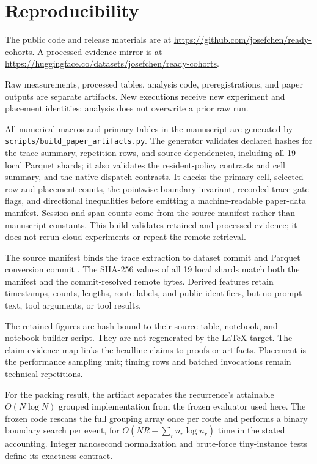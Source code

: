 \section{Reproducibility}
\label{sec:reproducibility}

The public code and release materials are at
\url{https://github.com/josefchen/ready-cohorts}. A processed-evidence mirror is
at \url{https://huggingface.co/datasets/josefchen/ready-cohorts}.

Raw measurements, processed tables, analysis code, preregistrations, and paper
outputs are separate artifacts. New executions receive new experiment and
placement identities; analysis does not overwrite a prior raw run.

All numerical macros and primary tables in the manuscript are generated by
\texttt{scripts/build\_paper\_artifacts.py}. The generator validates declared
hashes for the trace summary, repetition rows, and source dependencies,
including all 19 local Parquet shards; it also validates the resident-policy
contrasts and cell summary, and the native-dispatch contrasts. It checks the
primary cell, selected row and placement counts, the pointwise boundary
invariant, recorded trace-gate flags, and directional inequalities before
emitting a machine-readable paper-data manifest. Session and span counts come
from the source manifest rather than manuscript constants. This build validates
retained and processed evidence; it does not rerun cloud experiments or repeat
the remote retrieval.

The source manifest binds the trace extraction to dataset commit
 and Parquet conversion commit
. The SHA-256 values of all 19
local shards match both the manifest and the commit-resolved remote bytes.
Derived features retain timestamps, counts, lengths, route labels, and public
identifiers, but no prompt text, tool arguments, or tool results.

The retained figures are hash-bound to their source table, notebook, and
notebook-builder script. They are not regenerated by the LaTeX target. The
claim-evidence map links the headline claims to proofs or artifacts. Placement
is the performance sampling unit; timing rows and batched invocations remain
technical repetitions.

For the packing result, the artifact separates the recurrence's attainable
$O(N\log N)$ grouped implementation from the frozen evaluator used here. The
frozen code rescans the full grouping array once per route and performs a binary
boundary search per event, for
$O(NR+\sum_r n_r\log n_r)$ time in the stated accounting. Integer nanosecond
normalization and brute-force tiny-instance tests define its exactness contract.

